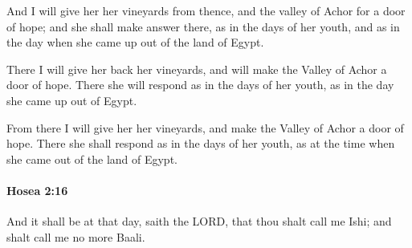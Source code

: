 			\begin{versebox}
					\item[BHS] 
					\item[LXX] 
					\item[ASV] And I will give her her vineyards from thence, and the valley of Achor for a door of hope; and she shall make answer there, as in the days of her youth, and as in the day when she came up out of the land of Egypt.
					\item[NIV] There I will give her back her vineyards, and will make the Valley of Achor a door of hope. There she will respond as in the days of her youth, as in the day she came up out of Egypt.
					\item[NRSV] From there I will give her her vineyards, and make the Valley of Achor a door of hope. There she shall respond as in the days of her youth, as at the time when she came out of the land of Egypt.
			\end{versebox}

		\paragraph{Hosea 2:16} %
			\label{HOSEA-2-16}

			And it shall be at that day, saith the LORD, that thou shalt call me Ishi; and shalt call me no more Baali.

